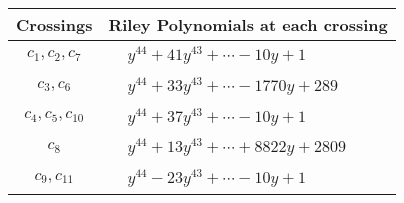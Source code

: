 \documentclass[1p]{elsarticle_modified}
\theoremstyle{definition}
\begin{document}
\begin{tabular}{m{50pt}|m{274pt}}
Crossings & \hspace{64pt}Riley Polynomials at each crossing \\
\hline $$\begin{aligned}c_{1},c_{2},c_{7}\end{aligned}$$&$\begin{aligned}
&y^{44}+41 y^{43}+\cdots-10 y+1
\end{aligned}$\\
\hline $$\begin{aligned}c_{3},c_{6}\end{aligned}$$&$\begin{aligned}
&y^{44}+33 y^{43}+\cdots-1770 y+289
\end{aligned}$\\
\hline $$\begin{aligned}c_{4},c_{5},c_{10}\end{aligned}$$&$\begin{aligned}
&y^{44}+37 y^{43}+\cdots-10 y+1
\end{aligned}$\\
\hline $$\begin{aligned}c_{8}\end{aligned}$$&$\begin{aligned}
&y^{44}+13 y^{43}+\cdots+8822 y+2809
\end{aligned}$\\
\hline $$\begin{aligned}c_{9},c_{11}\end{aligned}$$&$\begin{aligned}
&y^{44}-23 y^{43}+\cdots-10 y+1
\end{aligned}$\\
\hline
\end{tabular}
\vskip 2pc
\end{document}
